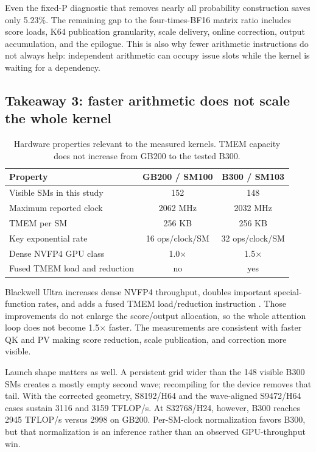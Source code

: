 Even the fixed-P diagnostic that removes nearly all probability construction
saves only 5.23\%.  The remaining gap to the four-times-BF16 matrix ratio
includes score loads, K64 publication granularity, scale delivery, online
correction, output accumulation, and the epilogue.  This is also why fewer
arithmetic instructions do not always help: independent arithmetic can occupy
issue slots while the kernel is waiting for a dependency.

\subsection{Takeaway 3: faster arithmetic does not scale the whole kernel}

\begin{table}[htbp]
\centering
\caption{Hardware properties relevant to the measured kernels.  TMEM capacity
does not increase from GB200 to the tested B300.}
\label{tab:blackwell-generations}
\small
\begin{tabular}{lcc}
\toprule
Property & GB200 / SM100 & B300 / SM103 \\
\midrule
Visible SMs in this study & 152 & 148 \\
Maximum reported clock & 2062 MHz & 2032 MHz \\
TMEM per SM & 256 KB & 256 KB \\
Key exponential rate & 16 ops/clock/SM & 32 ops/clock/SM \\
Dense NVFP4 GPU class & 1.0$\times$ & 1.5$\times$ \\
Fused TMEM load and reduction & no & yes \\
\bottomrule
\end{tabular}
\end{table}

Blackwell Ultra increases dense NVFP4 throughput, doubles important
special-function rates, and adds a fused TMEM load/reduction instruction
\cite{nvidia2025blackwellultra,nvidia2026ptx,zadouri2026flashattention4}.
Those improvements do not enlarge the score/output allocation, so the whole
attention loop does not become 1.5$\times$ faster.  The measurements are
consistent with faster QK and PV making score reduction, scale publication,
and correction more visible.

Launch shape matters as well.  A persistent grid wider than the 148 visible
B300 SMs creates a mostly empty second wave; recompiling for the device removes
that tail.  With the corrected geometry, S8192/H64 and the wave-aligned
S9472/H64 cases sustain 3116 and 3159 TFLOP/s.  At S32768/H24, however, B300
reaches 2945 TFLOP/s versus 2998 on GB200.  Per-SM-clock normalization favors
B300, but that normalization is an inference rather than an observed
GPU-throughput win.


